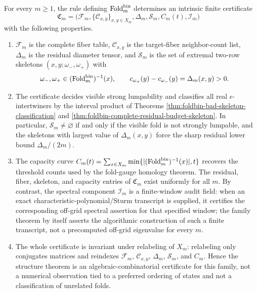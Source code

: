\begin{theorem}\label{thm:foldbin-algorithmic-certificate-schema}
For every \(m\ge1\), the rule defining \(\operatorname{Fold}_m^{\mathrm{bin}}\) determines an intrinsic finite certificate
\[
\mathfrak C_m=\bigl(\mathcal F_m,\{\mathcal C_{x,y}\}_{x,y\in X_m},\Delta_m,
\mathcal S_m, C_m(t),\mathcal I_m\bigr)
\]
with the following properties.
\begin{enumerate}[label=\textup{(\roman*)}]
\item \(\mathcal F_m\) is the complete fiber table, \(\mathcal C_{x,y}\) is the target-fiber neighbor-count list, \(\Delta_m\) is the residual diameter tensor, and \(\mathcal S_m\) is the set of extremal two-row skeletons \((x,y;\omega_-,\omega_+)\) with
\[
\omega_-,\omega_+\in(\operatorname{Fold}_m^{\mathrm{bin}})^{-1}(x),
\qquad
c_{\omega_+}(y)-c_{\omega_-}(y)=\Delta_m(x,y)>0.
\]
\item The certificate decides visible strong lumpability and classifies all real \(\epsilon\)-intertwiners by the interval product of Theorems \ref{thm:foldbin-bad-skeleton-classification} and \ref{thm:foldbin-complete-residual-budget-skeleton}.  In particular, \(\mathcal S_m\ne\varnothing\) if and only if the visible fold is not strongly lumpable, and the skeletons with largest value of \(\Delta_m(x,y)\) force the sharp residual lower bound \(\Delta_m/(2m)\).
\item The capacity curve \(C_m(t)=\sum_{x\in X_m}\min\{|(\operatorname{Fold}_m^{\mathrm{bin}})^{-1}(x)|,t\}\) recovers the threshold counts used by the fold-gauge homology theorem.  The residual, fiber, skeleton, and capacity entries of \(\mathfrak C_m\) exist uniformly for all \(m\).  By contrast, the spectral component \(\mathcal I_m\) is a finite-window audit field: when an exact characteristic-polynomial/Sturm transcript is supplied, it certifies the corresponding off-grid spectral assertion for that specified window; the family theorem by itself asserts the algorithmic construction of such a finite transcript, not a precomputed off-grid eigenvalue for every \(m\).
\item The whole certificate is invariant under relabeling of \(X_m\): relabeling only conjugates matrices and reindexes \(\mathcal F_m\), \(\mathcal C_{x,y}\), \(\Delta_m\), \(\mathcal S_m\), and \(C_m\).  Hence the structure theorem is an algebraic-combinatorial certificate for this family, not a numerical observation tied to a preferred ordering of states and not a classification of unrelated folds.

\end{enumerate}
\end{theorem}
